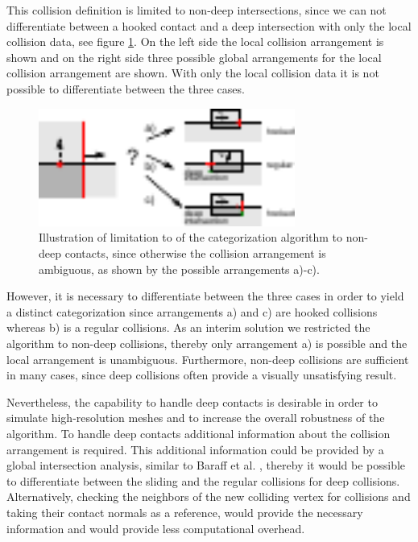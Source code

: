 This collision definition is limited to non-deep intersections, since we can not differentiate between a hooked contact and a deep intersection with only the local collision data, see figure \ref{fig::limitCategory}. On the left side the local collision arrangement is shown and on the right side three possible global arrangements for the  local collision arrangement are shown. With only the local collision data it is not possible to differentiate between the three cases.
\begin{figure}[h] 
  \centering
     \includegraphics[width=0.75\textwidth]{pics/pdf/limitCategory.pdf}
  \caption[Illustration of limitation to of the algorithm to non-deep contacts.]{Illustration of limitation to of the categorization algorithm to non-deep contacts, since otherwise the collision arrangement is ambiguous, as shown by the possible arrangements a)-c).}
  \label{fig::limitCategory}
\end{figure}
 However, it is necessary to differentiate between the three cases in order to yield a distinct categorization since arrangements a) and c) are hooked collisions whereas b) is a regular collisions.
 As an interim solution we restricted the algorithm to non-deep collisions, thereby only arrangement a) is possible and the local arrangement is unambiguous. Furthermore, non-deep collisions are sufficient in many cases, since deep collisions often provide a visually unsatisfying result. 
  
 Nevertheless, the capability to handle deep contacts is desirable in order to simulate high-resolution meshes and to increase the overall robustness of the algorithm. To handle deep contacts additional information about the collision arrangement is required. This additional information could be provided by a global intersection analysis, similar to Baraff et al. \cite{BARAFF2003}, thereby it would be possible to differentiate between the sliding and the regular collisions for deep collisions. Alternatively, checking the neighbors of the new colliding vertex for collisions and taking their contact normals as a reference, would provide the necessary information and would provide less computational overhead.
 

